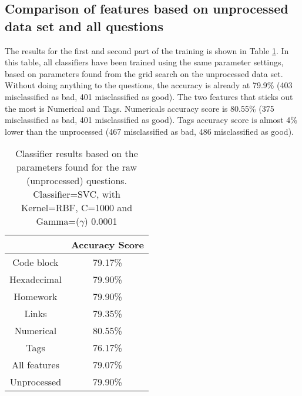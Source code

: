 \subsection{Comparison of features based on unprocessed data set and all questions}
\label{sec:comparison_all_questions_unprocessed}
The results for the first and second part of the training is shown in Table \ref{tab:singular_feature_detector_so}.
In this table, all classifiers have been trained using the same parameter settings, based on parameters found from the grid search on the unprocessed data set.
Without doing anything to the questions, the accuracy is already at 79.9\% (403 misclassified as bad, 401 misclassified as good).
The two features that sticks out the most is Numerical and Tags. 
Numericals accuracy score is 80.55\% (375 misclassified as bad, 401 misclassified as good).
Tags accuracy score is almost 4\% lower than the unprocessed (467 misclassified as bad, 486 misclassified as good).
\begin{table}[!h]%
	\centering
	\begin{tabular}{| c | c |}
		\hline
		~ 				& Accuracy Score	\\ \hline
		Code block 		& 79.17\%			\\ \hline
		Hexadecimal		& 79.90\%			\\ \hline
		Homework 		& 79.90\%			\\ \hline
		Links			& 79.35\%			\\ \hline				
		Numerical		& 80.55\%			\\ \hline
		Tags			& 76.17\%			\\ \hline
		All features	& 79.07\%			\\ \hline
		Unprocessed		& 79.90\%			\\ \hline
	\end{tabular}
	\caption{Classifier results based on the parameters found for the raw (unprocessed) questions. Classifier=SVC, with Kernel=RBF, C=1000 and Gamma=($\gamma$) 0.0001}	
	\label{tab:singular_feature_detector_so}
\end{table}


